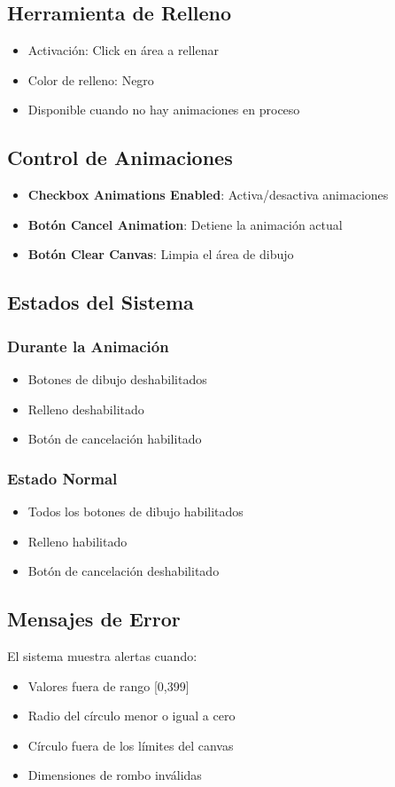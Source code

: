\documentclass[12pt]{article}
\begin{document}
\subsection{Herramienta de Relleno}
\begin{itemize}
    \item Activación: Click en área a rellenar
    \item Color de relleno: Negro
    \item Disponible cuando no hay animaciones en proceso
\end{itemize}

\subsection{Control de Animaciones}
\begin{itemize}
    \item \textbf{Checkbox Animations Enabled}: Activa/desactiva animaciones
    \item \textbf{Botón Cancel Animation}: Detiene la animación actual
    \item \textbf{Botón Clear Canvas}: Limpia el área de dibujo
\end{itemize}

\subsection{Estados del Sistema}
\subsubsection{Durante la Animación}
\begin{itemize}
    \item Botones de dibujo deshabilitados
    \item Relleno deshabilitado
    \item Botón de cancelación habilitado
\end{itemize}

\subsubsection{Estado Normal}
\begin{itemize}
    \item Todos los botones de dibujo habilitados
    \item Relleno habilitado
    \item Botón de cancelación deshabilitado
\end{itemize}

\subsection{Mensajes de Error}
El sistema muestra alertas cuando:
\begin{itemize}
    \item Valores fuera de rango [0,399]
    \item Radio del círculo menor o igual a cero
    \item Círculo fuera de los límites del canvas
    \item Dimensiones de rombo inválidas
\end{itemize}
\end{document}
